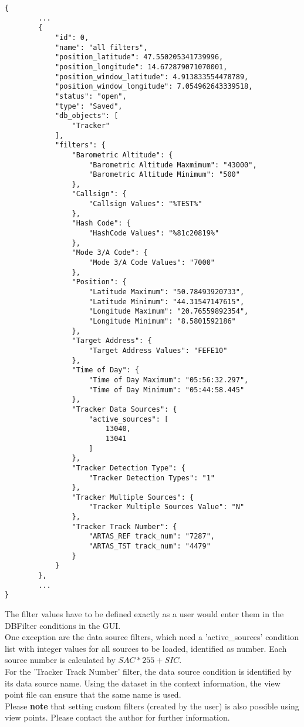 \begin{lstlisting}[basicstyle=\small\ttfamily]
{
        ...
        {
            "id": 0,
            "name": "all filters",
            "position_latitude": 47.550205341739996,
            "position_longitude": 14.672879071070001,
            "position_window_latitude": 4.913833554478789,
            "position_window_longitude": 7.054962643339518,
            "status": "open",
            "type": "Saved",
            "db_objects": [
                "Tracker"
            ],
            "filters": {
                "Barometric Altitude": {
                    "Barometric Altitude Maxmimum": "43000",
                    "Barometric Altitude Minimum": "500"
                },
                "Callsign": {
                    "Callsign Values": "%TEST%"
                },
                "Hash Code": {
                    "HashCode Values": "%81c20819%"
                },
                "Mode 3/A Code": {
                    "Mode 3/A Code Values": "7000"
                },
                "Position": {
                    "Latitude Maximum": "50.78493920733",
                    "Latitude Minimum": "44.31547147615",
                    "Longitude Maximum": "20.76559892354",
                    "Longitude Minimum": "8.5801592186"
                },
                "Target Address": {
                    "Target Address Values": "FEFE10"
                },
                "Time of Day": {
                    "Time of Day Maximum": "05:56:32.297",
                    "Time of Day Minimum": "05:44:58.445"
                },
                "Tracker Data Sources": {
                    "active_sources": [
                        13040,
                        13041
                    ]
                },
                "Tracker Detection Type": {
                    "Tracker Detection Types": "1"
                },
                "Tracker Multiple Sources": {
                    "Tracker Multiple Sources Value": "N"
                },
                "Tracker Track Number": {
                    "ARTAS_REF track_num": "7287",
                    "ARTAS_TST track_num": "4479"
                }
            }
        },
        ...
}
\end{lstlisting}        

The filter values have to be defined exactly as a user would enter them in the DBFilter conditions in the GUI. \\

One exception are the data source filters, which need a 'active\_sources' condition list with integer values for all sources to be loaded, identified as number. Each source number is calculated by $SAC*255+SIC$. \\

For the 'Tracker Track Number' filter, the data source condition is identified by its data source name. Using the dataset in the context information, the view point file can ensure that the same name is used. \\

Please \textbf{note} that setting custom filters (created by the user) is also possible using view points. Please contact the author for further information.
